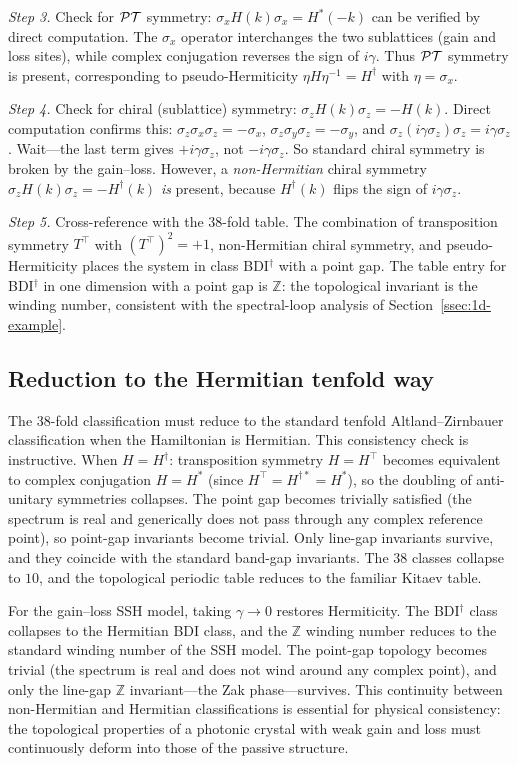 \emph{Step 3.} Check for $\mathcal{PT}$ symmetry: $\sigma_x H(k)\sigma_x = H^*(-k)$
can be verified by direct computation. The $\sigma_x$ operator
interchanges the two sublattices (gain and loss sites), while complex
conjugation reverses the sign of $i\gamma$. Thus $\mathcal{PT}$ symmetry is
present, corresponding to pseudo-Hermiticity $\eta H \eta^{-1} = H^\dagger$
with $\eta = \sigma_x$.

\emph{Step 4.} Check for chiral (sublattice) symmetry:
$\sigma_z H(k) \sigma_z = -H(k)$. Direct computation confirms this:
$\sigma_z \sigma_x \sigma_z = -\sigma_x$,
$\sigma_z \sigma_y \sigma_z = -\sigma_y$, and
$\sigma_z (i\gamma\sigma_z) \sigma_z = i\gamma\sigma_z$. Wait---the
last term gives $+i\gamma\sigma_z$, not $-i\gamma\sigma_z$. So
standard chiral symmetry is broken by the gain--loss. However, a
\emph{non-Hermitian} chiral symmetry $\sigma_z H(k) \sigma_z = -H^\dagger(k)$
\emph{is} present, because $H^\dagger(k)$ flips the sign of
$i\gamma\sigma_z$.

\emph{Step 5.} Cross-reference with the 38-fold table. The combination
of transposition symmetry $T^\top$ with $(T^\top)^2 = +1$, non-Hermitian
chiral symmetry, and pseudo-Hermiticity places the system in class
BDI$^\dagger$ with a point gap. The table entry for BDI$^\dagger$ in
one dimension with a point gap is $\mathbb{Z}$: the topological
invariant is the winding number, consistent with the spectral-loop
analysis of Section~\ref{ssec:1d-example}.

\subsection{Reduction to the Hermitian tenfold way}
\label{ssec:hermitian-reduction}

The 38-fold classification must reduce to the standard tenfold
Altland--Zirnbauer classification when the Hamiltonian is Hermitian.
This consistency check is instructive. When $H = H^\dagger$:
transposition symmetry $H = H^\top$ becomes equivalent to complex
conjugation $H = H^*$ (since $H^\top = H^{\dagger *} = H^*$), so the
doubling of anti-unitary symmetries collapses. The point gap becomes
trivially satisfied (the spectrum is real and generically does not pass
through any complex reference point), so point-gap invariants become
trivial. Only line-gap invariants survive, and they coincide with the
standard band-gap invariants. The $38$ classes collapse to $10$, and
the topological periodic table reduces to the familiar Kitaev table.

For the gain--loss SSH model, taking $\gamma \to 0$ restores Hermiticity.
The BDI$^\dagger$ class collapses to the Hermitian BDI class, and the
$\mathbb{Z}$ winding number reduces to the standard winding number of
the SSH model. The point-gap topology becomes trivial (the spectrum
is real and does not wind around any complex point), and only the
line-gap $\mathbb{Z}$ invariant---the Zak phase---survives. This
continuity between non-Hermitian and Hermitian classifications is
essential for physical consistency: the topological properties of a
photonic crystal with weak gain and loss must continuously deform into
those of the passive structure.

